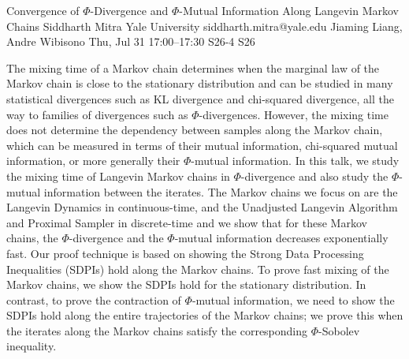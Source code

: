 \begin{talk}
  {Convergence of $\Phi$-Divergence and $\Phi$-Mutual Information Along Langevin Markov Chains}%
  {Siddharth Mitra}%
  {Yale University}%
  {siddharth.mitra@yale.edu}%
  {Jiaming Liang, Andre Wibisono}%
  {}%
  {Thu, Jul 31 17:00--17:30}%
  {S26-4}%
  {S26}%
  
    
   
The mixing time of a Markov chain determines when the marginal law of the Markov chain is close to the stationary distribution and can be studied in many statistical divergences such as KL divergence and chi-squared divergence, all the way to families of divergences such as $\Phi$-divergences. However, the mixing time does not determine the dependency between samples along the Markov chain, which can be measured in terms of their mutual information, chi-squared mutual information, or more generally their $\Phi$-mutual information. In this talk, we study the mixing time of Langevin Markov chains in $\Phi$-divergence and also study the $\Phi$-mutual information between the iterates. The Markov chains we focus on are the Langevin Dynamics in continuous-time, and the Unadjusted Langevin Algorithm and Proximal Sampler in discrete-time and we show that for these Markov chains, the $\Phi$-divergence and the $\Phi$-mutual information decreases exponentially fast. Our proof technique is based on showing the Strong Data Processing Inequalities (SDPIs) hold along the Markov chains. To prove fast mixing of the Markov chains, we show the SDPIs hold for the stationary distribution. In contrast, to prove the contraction of $\Phi$-mutual information, we need to show the SDPIs hold along the entire trajectories of the Markov chains; we prove this when the iterates along the Markov chains satisfy the corresponding $\Phi$-Sobolev inequality.


\medskip


\end{talk}

